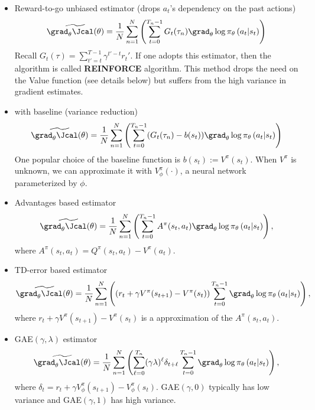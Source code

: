 \begin{itemize}
    \item Reward-to-go unbiased estimator (drops $a_t$'s dependency on the past actions)
    $$
    \widetilde{\grad_{\theta} \Jcal(\theta)}  = \frac{1}{N}\sum_{n=1}^{N} \left(\sum_{t=0}^{T_{n}-1}G_t(\tau_n)\grad_{\theta}\log \pi_\theta\left(a_t | s_t\right) \right)
    $$
    Recall $G_t(\tau) = \sum_{t'=t}^{T-1}\gamma^{t'-t}r_t'$. If one adopts this estimator, then the algorithm is called \textbf{REINFORCE} algorithm. This method drops the need on the Value function (see details below) but suffers from the high variance in gradient estimates.
    \item with baseline (variance reduction)
    $$
    \widetilde{\grad_{\theta} \Jcal(\theta)}  = \frac{1}{N}\sum_{n=1}^{N} \left(  \sum_{t=0}^{T_{n}-1} (G_t(\tau_n) - b(s_t)) \grad_{\theta} \log \pi_\theta\left(a_t | s_t\right) \right)
    $$
    One popular choice of the baseline function is $b(s_t):=V^{\pi}(s_t)$. When $V^{\pi}$ is unknown, we can approximate it with $V^{\pi}_{\phi}(\cdot)$, a neural network parameterized by $\phi$.

    \item Advantages based estimator 
     $$
    \widetilde{\grad_{\theta} \Jcal(\theta)}  = \frac{1}{N}\sum_{n=1}^{N} \left(\sum_{t=0}^{T_{n}-1}A^{\pi}(s_t, a_t) \grad_{\theta} \log \pi_\theta\left(a_t | s_t\right) \right),
    $$
    where $A^{\pi}(s_t, a_t)=Q^{\pi}(s_t, a_t) - V^{\pi}(a_t)$.

    \item TD-error based estimator 
     $$
    \widetilde{\grad_{\theta} \Jcal(\theta)}  = \frac{1}{N}\sum_{n=1}^{N} \left( (r_t+\gamma V^{\pi}(s_{t+1}) - V^{\pi}(s_t)) \sum_{t=0}^{T_{n}-1}\grad_{\theta} \log \pi_\theta\left(a_t | s_t\right) \right),
    $$
    where $r_t+\gamma V^{\pi}(s_{t+1}) - V^{\pi}(s_t)$ is a approximation of the $A^{\pi}(s_t, a_t)$.

    \item GAE$(\gamma, \lambda)$ estimator
    $$
    \widetilde{\grad_{\theta} \Jcal(\theta)}  = \frac{1}{N}\sum_{n=1}^{N} \left( \sum_{\ell=0}^{T_n}(\gamma\lambda)^{\ell}\delta_{t+\ell} \sum_{t=0}^{T_{n}-1}\grad_{\theta} \log \pi_\theta\left(a_t | s_t\right) \right),
    $$
    where $\delta_t=r_t + \gamma V^{\pi}_{\phi}(s_{t+1}) -  V^{\pi}_{\phi}(s_{t})$.
    GAE$(\gamma, 0)$ typically has low variance and GAE$(\gamma, 1)$ has high variance.
\end{itemize}

